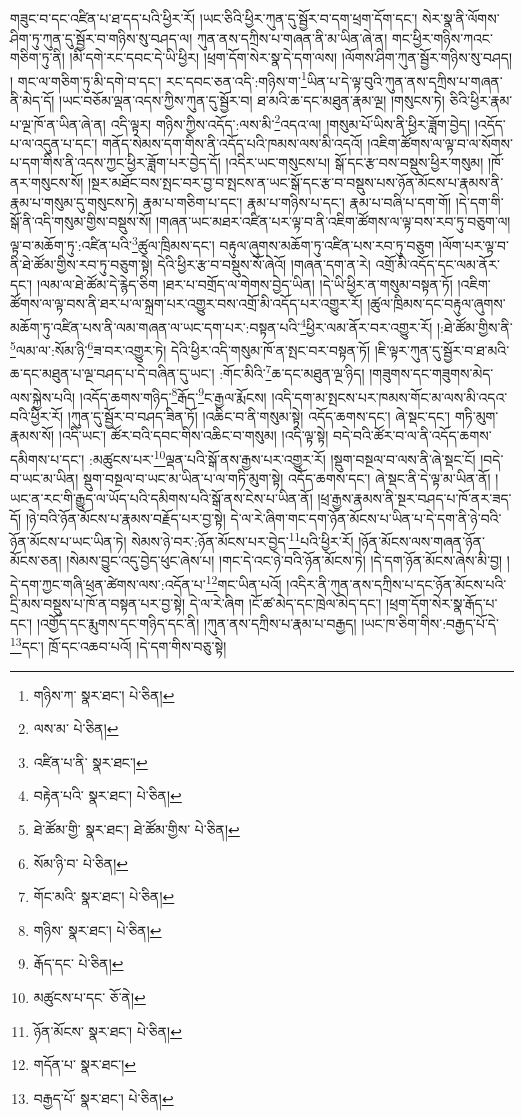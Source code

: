 གཟུང་བ་དང་འཛིན་པ་ཐ་དད་པའི་ཕྱིར་རོ། །ཡང་ཅིའི་ཕྱིར་ཀུན་དུ་སྦྱོར་བ་དག་ཕྲག་དོག་དང་། སེར་སྣ་ནི་ལོགས་ཤིག་ཏུ་ཀུན་དུ་སྦྱོར་བ་གཉིས་སུ་བཤད་ལ། ཀུན་ནས་དཀྲིས་པ་གཞན་ནི་མ་ཡིན་ཞེ་ན། གང་ཕྱིར་གཉིས་ཀའང་གཅིག་ཏུ་ནི། །མི་དགེ་རང་དབང་དེ་ཡི་ཕྱིར། །ཕྲག་དོག་སེར་སྣ་དེ་དག་ལས། །ལོགས་ཤིག་ཀུན་སྦྱོར་གཉིས་སུ་བཤད། །
གང་ལ་གཅིག་ཏུ་མི་དགེ་བ་དང་། རང་དབང་ཅན་འདི་:གཉིས་ག་\footnote{གཉིས་ཀ་  སྣར་ཐང་།  པེ་ཅིན། }ཡིན་པ་དེ་ལྟ་བུའི་ཀུན་ནས་དཀྲིས་པ་གཞན་ནི་མེད་དོ། །ཡང་བཅོམ་ལྡན་འདས་ཀྱིས་ཀུན་དུ་སྦྱོར་བ། ཐ་མའི་ཆ་དང་མཐུན་རྣམ་ལྔ། །གསུངས་ཏེ། ཅིའི་ཕྱིར་རྣམ་པ་ལྔ་ཁོ་ན་ཡིན་ཞེ་ན། འདི་ལྟར། གཉིས་ཀྱིས་འདོད་:ལས་མི་\footnote{ལས་མ་  པེ་ཅིན། }འདའ་ལ། །གསུམ་པོ་ཡིས་ནི་ཕྱིར་ཟློག་བྱེད། །འདོད་པ་ལ་འདུན་པ་དང་། གནོད་སེམས་དག་གིས་ནི་འདོད་པའི་ཁམས་ལས་མི་འདའོ། །འཇིག་ཚོགས་ལ་ལྟ་བ་ལ་སོགས་པ་དག་གིས་ནི་འདས་ཀྱང་ཕྱིར་ཟློག་པར་བྱེད་དོ། །འདིར་ཡང་གསུངས་པ། སྒོ་དང་རྩ་བས་བསྡུས་ཕྱིར་གསུམ། །ཁོ་ནར་གསུངས་སོ། །སྔར་མཐོང་བས་སྤང་བར་བྱ་བ་སྤངས་ན་ཡང་སྒོ་དང་རྩ་བ་བསྡུས་པས་ཉོན་མོངས་པ་རྣམས་ནི་རྣམ་པ་གསུམ་དུ་གསུངས་ཏེ། རྣམ་པ་གཅིག་པ་དང་། རྣམ་པ་གཉིས་པ་དང་། རྣམ་པ་བཞི་པ་དག་གོ། །དེ་དག་གི་སྒོ་ནི་འདི་གསུམ་གྱིས་བསྡུས་སོ། །གཞན་ཡང་མཐར་འཛིན་པར་ལྟ་བ་ནི་འཇིག་ཚོགས་ལ་ལྟ་བས་རབ་ཏུ་བཅུག་ལ། ལྟ་བ་མཆོག་ཏུ་:འཛིན་པའི་\footnote{འཛིན་པ་ནི་  སྣར་ཐང་། }ཚུལ་ཁྲིམས་དང་། བརྟུལ་ཞུགས་མཆོག་ཏུ་འཛིན་པས་རབ་ཏུ་བཅུག །ལོག་པར་ལྟ་བ་ནི་ཐེ་ཚོམ་གྱིས་རབ་ཏུ་བཅུག་སྟེ། དེའི་ཕྱིར་རྩ་བ་བསྡུས་སོ་ཞེའོ། །གཞན་དག་ན་རེ། འགྲོ་མི་འདོད་དང་ལམ་ནོར་དང་། །ལམ་ལ་ཐེ་ཚོམ་དེ་རྙེད་ཅིག །ཐར་པ་བགྲོད་ལ་གེགས་བྱེད་ཡིན། །དེ་ཡི་ཕྱིར་ན་གསུམ་བསྟན་ཏོ། །འཇིག་ཚོགས་ལ་ལྟ་བས་ནི་ཐར་པ་ལ་སྐྲག་པར་འགྱུར་བས་འགྲོ་མི་འདོད་པར་འགྱུར་རོ། །ཚུལ་ཁྲིམས་དང་བརྟུལ་ཞུགས་མཆོག་ཏུ་འཛིན་པས་ནི་ལམ་གཞན་ལ་ཡང་དག་པར་:བསྟན་པའི་\footnote{བརྟེན་པའི་  སྣར་ཐང་།  པེ་ཅིན། }ཕྱིར་ལམ་ནོར་བར་འགྱུར་རོ། །:ཐེ་ཚོམ་གྱིས་ནི་\footnote{ཐེ་ཚོམ་གྱི་  སྣར་ཐང་། ཐེ་ཚོམ་གྱིས་  པེ་ཅིན། }ལམ་ལ་:སོམ་ཉི་\footnote{སོམ་ཉི་བ་  པེ་ཅིན། }ཟ་བར་འགྱུར་ཏེ། དེའི་ཕྱིར་འདི་གསུམ་ཁོ་ན་སྤང་བར་བསྟན་ཏོ། །ཇི་ལྟར་ཀུན་དུ་སྦྱོར་བ་ཐ་མའི་ཆ་དང་མཐུན་པ་ལྔ་བཤད་པ་དེ་བཞིན་དུ་ཡང་། :གོང་མིའི་\footnote{གོང་མའི་  སྣར་ཐང་།  པེ་ཅིན། }ཆ་དང་མཐུན་ལྔ་ཉིད། །གཟུགས་དང་གཟུགས་མེད་ལས་སྐྱེས་པའི། །འདོད་ཆགས་གཉིད་\footnote{གཉིས་  སྣར་ཐང་།  པེ་ཅིན། }རྒོད་\footnote{རྒོད་དང་  པེ་ཅིན། }ང་རྒྱལ་རྨོངས། །འདི་དག་མ་སྤངས་པར་ཁམས་གོང་མ་ལས་མི་འདའ་བའི་ཕྱིར་རོ། །ཀུན་དུ་སྦྱོར་བ་བཤད་ཟིན་ཏོ། །འཆིང་བ་ནི་གསུམ་སྟེ། འདོད་ཆགས་དང་། ཞེ་སྡང་དང་། གཏི་མུག་རྣམས་སོ། །འདི་ཡང་། ཚོར་བའི་དབང་གིས་འཆིང་བ་གསུམ། །འདི་ལྟ་སྟེ། བདེ་བའི་ཚོར་བ་ལ་ནི་འདོད་ཆགས་དམིགས་པ་དང་། :མཚུངས་པར་\footnote{མཚུངས་པ་དང་  ཅོ་ནེ། }ལྡན་པའི་སྒོ་ནས་རྒྱས་པར་འགྱུར་རོ། །སྡུག་བསྔལ་བ་ལས་ནི་ཞེ་སྡང་ངོ། །བདེ་བ་ཡང་མ་ཡིན། སྡུག་བསྔལ་བ་ཡང་མ་ཡིན་པ་ལ་གཏི་མུག་སྟེ། འདོད་ཆགས་དང་། ཞེ་སྡང་ནི་དེ་ལྟ་མ་ཡིན་ནོ། །ཡང་ན་རང་གི་རྒྱུད་ལ་ཡོད་པའི་དམིགས་པའི་སྒོ་ནས་ངེས་པ་ཡིན་ནོ། །ཕྲ་རྒྱས་རྣམས་ནི་སྔར་བཤད་པ་ཁོ་ནར་ཟད་དོ། །ཉེ་བའི་ཉོན་མོངས་པ་རྣམས་བརྗོད་པར་བྱ་སྟེ། དེ་ལ་རེ་ཞིག་གང་དག་ཉོན་མོངས་པ་ཡིན་པ་དེ་དག་ནི་ཉེ་བའི་ཉོན་མོངས་པ་ཡང་ཡིན་ཏེ། སེམས་ཉེ་བར་:ཉོན་མོངས་པར་བྱེད་\footnote{ཉོན་མོངས་  སྣར་ཐང་།  པེ་ཅིན། }པའི་ཕྱིར་རོ། །ཉོན་མོངས་ལས་གཞན་ཉོན་མོངས་ཅན། །སེམས་བྱུང་འདུ་བྱེད་ཕུང་ཞེས་པ། །གང་དེ་འང་ཉེ་བའི་ཉོན་མོངས་ཏེ། །དེ་དག་ཉོན་མོངས་ཞེས་མི་བྱ། །དེ་དག་ཀྱང་གཞི་ཕྲན་ཚེགས་ལས་:འདོན་པ་\footnote{གདོན་པ་  སྣར་ཐང་། }གང་ཡིན་པའོ། །འདིར་ནི་ཀུན་ནས་དཀྲིས་པ་དང་ཉོན་མོངས་པའི་དྲི་མས་བསྡུས་པ་ཁོ་ན་བསྟན་པར་བྱ་སྟེ། དེ་ལ་རེ་ཞིག །ངོ་ཚ་མེད་དང་ཁྲེལ་མེད་དང་། །ཕྲག་དོག་སེར་སྣ་རྒོད་པ་དང་། །འགྱོད་དང་རྨུགས་དང་གཉིད་དང་ནི། །ཀུན་ནས་དཀྲིས་པ་རྣམ་པ་བརྒྱད། །ཡང་ཁ་ཅིག་གིས་:བརྒྱད་པོ་དེ་\footnote{བརྒྱད་པོ་  སྣར་ཐང་།  པེ་ཅིན། }དང་། ཁྲོ་དང་འཆབ་པའོ། །དེ་དག་གིས་བཅུ་སྟེ། 